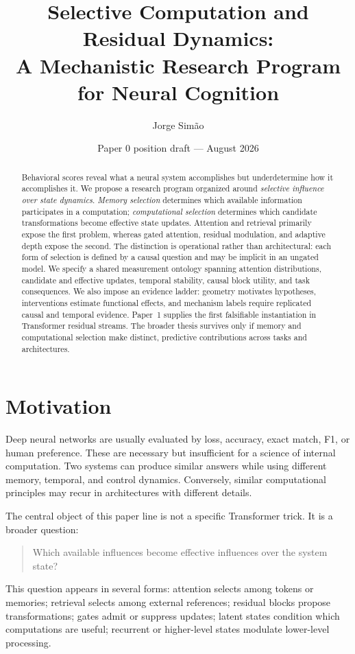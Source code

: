 \documentclass[10pt]{article}
\title{Selective Computation and Residual Dynamics:\\A Mechanistic Research Program for Neural Cognition}
\author{Jorge Sim\~ao}
\date{Paper 0 position draft --- August 2026}
\begin{document}
\maketitle

\begin{abstract}
Behavioral scores reveal what a neural system accomplishes but underdetermine how it accomplishes it. We propose a research program organized around \emph{selective influence over state dynamics}. \emph{Memory selection} determines which available information participates in a computation; \emph{computational selection} determines which candidate transformations become effective state updates. Attention and retrieval primarily expose the first problem, whereas gated attention, residual modulation, and adaptive depth expose the second. The distinction is operational rather than architectural: each form of selection is defined by a causal question and may be implicit in an ungated model. We specify a shared measurement ontology spanning attention distributions, candidate and effective updates, temporal stability, causal block utility, and task consequences. We also impose an evidence ladder: geometry motivates hypotheses, interventions estimate functional effects, and mechanism labels require replicated causal and temporal evidence. Paper~1 supplies the first falsifiable instantiation in Transformer residual streams. The broader thesis survives only if memory and computational selection make distinct, predictive contributions across tasks and architectures.
\end{abstract}

\section{Motivation}
Deep neural networks are usually evaluated by loss, accuracy, exact match, F1, or human preference. These are necessary but insufficient for a science of internal computation. Two systems can produce similar answers while using different memory, temporal, and control dynamics. Conversely, similar computational principles may recur in architectures with different details.

The central object of this paper line is not a specific Transformer trick. It is a broader question:
\begin{quote}
Which available influences become effective influences over the system state?
\end{quote}

This question appears in several forms: attention selects among tokens or memories; retrieval selects among external references; residual blocks propose transformations; gates admit or suppress updates; latent states condition which computations are useful; recurrent or higher-level states modulate lower-level processing.
\end{document}
